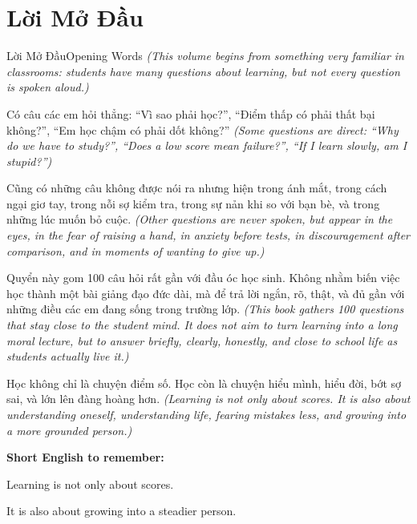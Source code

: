 \chapter*{Lời Mở Đầu}

\begin{truyen}{Lời Mở Đầu}{Opening Words}
\textit{(This volume begins from something very familiar in classrooms: students have many questions about learning, but not every question is spoken aloud.)}

Có câu các em hỏi thẳng: “Vì sao phải học?”, “Điểm thấp có phải thất bại không?”, “Em học chậm có phải dốt không?”
\textit{(Some questions are direct: “Why do we have to study?”, “Does a low score mean failure?”, “If I learn slowly, am I stupid?”)}

Cũng có những câu không được nói ra nhưng hiện trong ánh mắt, trong cách ngại giơ tay, trong nỗi sợ kiểm tra, trong sự nản khi so với bạn bè, và trong những lúc muốn bỏ cuộc.
\textit{(Other questions are never spoken, but appear in the eyes, in the fear of raising a hand, in anxiety before tests, in discouragement after comparison, and in moments of wanting to give up.)}

Quyển này gom 100 câu hỏi rất gần với đầu óc học sinh. Không nhằm biến việc học thành một bài giảng đạo đức dài, mà để trả lời ngắn, rõ, thật, và đủ gần với những điều các em đang sống trong trường lớp.
\textit{(This book gathers 100 questions that stay close to the student mind. It does not aim to turn learning into a long moral lecture, but to answer briefly, clearly, honestly, and close to school life as students actually live it.)}

\end{truyen}

\begin{baihoc}
Học không chỉ là chuyện điểm số. Học còn là chuyện hiểu mình, hiểu đời, bớt sợ sai, và lớn lên đàng hoàng hơn.
\textit{(Learning is not only about scores. It is also about understanding oneself, understanding life, fearing mistakes less, and growing into a more grounded person.)}
\end{baihoc}

\begin{ghinhoanh}
\textbf{Short English to remember:}

Learning is not only about scores.

It is also about growing into a steadier person.

\end{ghinhoanh}

